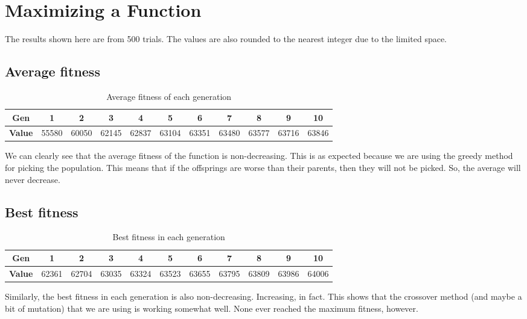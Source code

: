 \section{Maximizing a Function}

The results shown here are from 500 trials. The values are also rounded to the nearest integer due to the limited space.

\subsection{Average fitness}

\begin{table}[ht]
    \centering
    \begin{tabular}{ccccccccccc}
        \toprule
        \textbf{Gen} & 1 & 2 & 3 & 4 & 5 & 6 & 7 & 8 & 9 & 10 \\
        \midrule
        \textbf{Value} & 55580 & 60050 & 62145 & 62837 & 63104 & 63351 & 63480 & 63577 & 63716 & 63846 \\
        \bottomrule
    \end{tabular}
    \caption{Average fitness of each generation}
\end{table}

We can clearly see that the average fitness of the function is non-decreasing. This is as expected because we are using the greedy method for picking the population. This means that if the offsprings are worse than their parents, then they will not be picked. So, the average will never decrease.

\subsection{Best fitness}

\begin{table}[ht]
    \centering
    \begin{tabular}{ccccccccccc}
        \toprule
        \textbf{Gen} & 1 & 2 & 3 & 4 & 5 & 6 & 7 & 8 & 9 & 10 \\
        \midrule
        \textbf{Value} & 62361 & 62704 & 63035 & 63324 & 63523 & 63655 & 63795 & 63809 & 63986 & 64006 \\
        \bottomrule
    \end{tabular}
    \caption{Best fitness in each generation}
\end{table}

Similarly, the best fitness in each generation is also non-decreasing. Increasing, in fact. This shows that the crossover method (and maybe a bit of mutation) that we are using is working somewhat well. None ever reached the maximum fitness, however.

